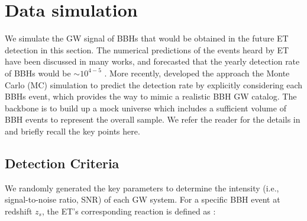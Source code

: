 \documentclass[twocolumn]{aastex62}
\begin{document}
\section{Data simulation} \label{sec_simulation}
We simulate the GW signal of BBHs that would be obtained in the future ET detection in this section. The numerical predictions of the events heard by ET have been discussed in many works, and forecasted that the yearly detection rate of BBHs would be $\sim10^{4-5}$ \citep{Abernathy2011, Ola2013, Biesiada2014}. More recently, \citet{Yang2019} developed the approach the Monte Carlo (MC) simulation to predict the detection rate by explicitly considering each BBHs event, which provides the way to mimic a realistic BBH GW catalog. The backbone is to build up a mock universe which includes a sufficient volume of BBH events to represent the overall sample. We refer the reader for the details in \citet[][Section 2, therein]{Yang2019}  and briefly recall the key points here.

\subsection{Detection Criteria} \label{subsec_criteria}
We randomly generated the key parameters to determine the intensity (i.e., signal-to-noise ratio, SNR) of each GW system. For a specific BBH event at redshift $z_s$, the ET's corresponding reaction is defined as \citep{Abernathy2011}:
\end{document}
